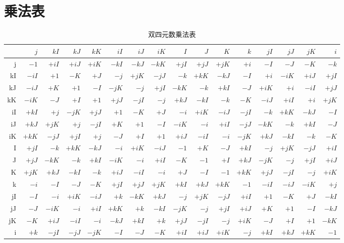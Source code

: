 \documentclass[dvipdfmx,a4paper]{article}
\begin{document}
\clearpage
\appendix
\section{乗法表}
\label{app:mult-table}

\begin{table}[ht]
  \begin{center}
    \caption{双四元数乗法表}
    \small
    \begin{tabular}{r|rrrrrrrrrrrrrrr}
      &$j$&$kI$&$kJ$&$kK$&$iI$&$iJ$&$iK$&$I$&$J$&$K$&$k$&$jI$&$jJ$&$jK$&$i$ \\ \hline
      j&$-1$&$+iI$&$+iJ$&$+iK$&$-kI$&$-kJ$&$-kK$&$+jI$&$+jJ$&$+jK$&$+i$&$-I$&$-J$&$-K$&$-k$ \\ \hline
      kI&$-iI$&$+1$&$-K$&$+J$&$-j$&$+jK$&$-jJ$&$-k$&$+kK$&$-kJ$&$-I$&$+i$&$-iK$&$+iJ$&$+jI$ \\ \hline
      kJ&$-iJ$&$+K$&$+1$&$-I$&$-jK$&$-j$&$+jI$&$-kK$&$-k$&$+kI$&$-J$&$+iK$&$+i$&$-iI$&$+jJ$ \\ \hline
      kK&$-iK$&$-J$&$+I$&$+1$&$+jJ$&$-jI$&$-j$&$+kJ$&$-kI$&$-k$&$-K$&$-iJ$&$+iI$&$+i$&$+jK$ \\ \hline
      iI&$+kI$&$+j$&$-jK$&$+jJ$&$+1$&$-K$&$+J$&$-i$&$+iK$&$-iJ$&$-jI$&$-k$&$+kK$&$-kJ$&$-I$ \\ \hline
      iJ&$+kJ$&$+jK$&$+j$&$-jI$&$+K$&$+1$&$-I$&$-iK$&$-i$&$+iI$&$-jJ$&$-kK$&$-k$&$+kI$&$-J$ \\ \hline
      iK&$+kK$&$-jJ$&$+jI$&$+j$&$-J$&$+I$&$+1$&$+iJ$&$-iI$&$-i$&$-jK$&$+kJ$&$-kI$&$-k$&$-K$ \\ \hline
      I&$+jI$&$-k$&$+kK$&$-kJ$&$-i$&$+iK$&$-iJ$&$-1$&$+K$&$-J$&$+kI$&$-j$&$+jK$&$-jJ$&$+iI$ \\ \hline
      J&$+jJ$&$-kK$&$-k$&$+kI$&$-iK$&$-i$&$+iI$&$-K$&$-1$&$+I$&$+kJ$&$-jK$&$-j$&$+jI$&$+iJ$ \\ \hline
      K&$+jK$&$+kJ$&$-kI$&$-k$&$+iJ$&$-iI$&$-i$&$+J$&$-I$&$-1$&$+kK$&$+jJ$&$-jI$&$-j$&$+iK$ \\ \hline
      k&$-i$&$-I$&$-J$&$-K$&$+jI$&$+jJ$&$+jK$&$+kI$&$+kJ$&$+kK$&$-1$&$-iI$&$-iJ$&$-iK$&$+j$ \\ \hline
      jI&$-I$&$-i$&$+iK$&$-iJ$&$+k$&$-kK$&$+kJ$&$-j$&$+jK$&$-jJ$&$+iI$&$+1$&$-K$&$+J$&$-kI$ \\ \hline
      jJ&$-J$&$-iK$&$-i$&$+iI$&$+kK$&$+k$&$-kI$&$-jK$&$-j$&$+jI$&$+iJ$&$+K$&$+1$&$-I$&$-kJ$ \\ \hline
      jK&$-K$&$+iJ$&$-iI$&$-i$&$-kJ$&$+kI$&$+k$&$+jJ$&$-jI$&$-j$&$+iK$&$-J$&$+I$&$+1$&$-kK$ \\ \hline
      i&$+k$&$-jI$&$-jJ$&$-jK$&$-I$&$-J$&$-K$&$+iI$&$+iJ$&$+iK$&$-j$&$+kI$&$+kJ$&$+kK$&$-1$ \\ \hline
    \end{tabular}
  \end{center}
\end{table}
\end{document}

